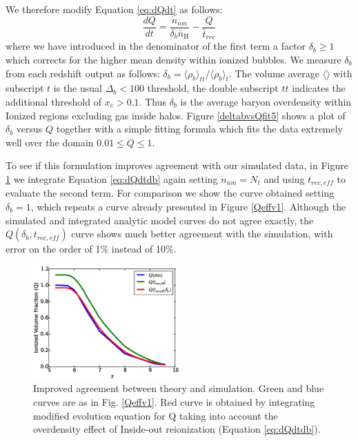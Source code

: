 
We therefore modify Equation \eqref{eq:dQdt} as follows:
\begin{equation}
	\frac{dQ}{dt} = \frac{\dot{n}_{ion}}{\delta_b\bar{n}_\mathrm{H}}-\frac{Q}{\bar{t}_{rec}}
	\label{eq:dQdtdb}
\end{equation}
where we have introduced in the denominator of the first term a factor $\delta_b \geq 1$ which corrects for the higher mean density within ionized bubbles. We measure $\delta_b$ from each redshift output as follows: $\delta_b = \langle \rho_b\rangle_{tt}/\langle \rho_b\rangle_{t}$. The volume average $\langle\rangle$ with subscript $t$ is the usual $\Delta_b<100$ threshold, the double subscript $tt$ indicates the additional threshold of $x_e>0.1$. Thus $\delta_b$ is the average baryon overdensity within Ionized regions excluding gas inside halos. Figure \ref{deltabvsQfit5} shows a plot of $\delta_b$ versus $Q$ together with a simple fitting formula which fits the data extremely well over the domain $0.01 \leq Q \leq 1$. 

To see if this formulation improves agreement with our simulated data, in Figure \ref{Qeffv2} we integrate Equation \eqref{eq:dQdtdb} again setting $\dot{n}_{ion}=\dot{N}_t$ and using $t_{rec,eff}$ to evaluate the second term. For comparison we show the curve obtained setting $\delta_b=1$, which repeats a curve already presented in Figure \ref{Qeffv1}.  Although the simulated and integrated analytic model curves do not agree exactly, the $Q(\delta_b,t_{rec,eff})$ curve shows much better agreement with the simulation, with error on the order of 1\% instead of 10\%.

\begin{figure}
	\includegraphics[width=0.5\textwidth]{Qeffv2.eps}
	\caption{Improved agreement between theory and simulation. Green and blue curves are as in Fig. \ref{Qeffv1}. Red curve is obtained by integrating modified evolution equation for Q taking into account the overdensity effect of Inside-out reionization (Equation \eqref{eq:dQdtdb}).}
	\label{Qeffv2}
\end{figure}

